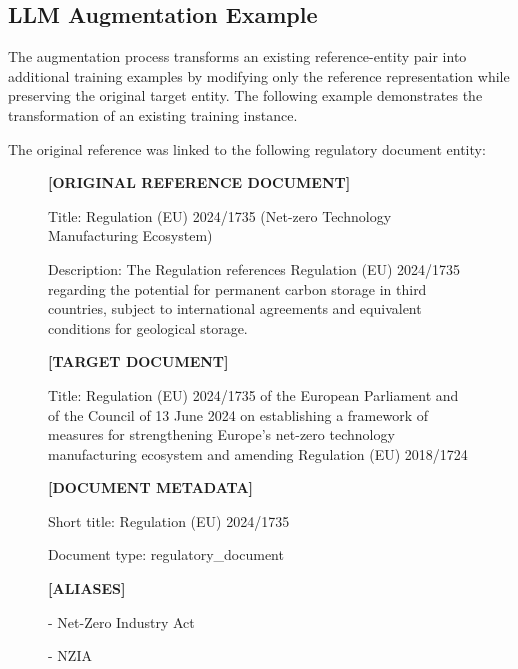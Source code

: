 \subsection{LLM Augmentation Example}

The augmentation process transforms an existing reference-entity pair into additional training examples by modifying only the reference representation while preserving the original target entity. The following example demonstrates the transformation of an existing training instance.

The original reference was linked to the following regulatory document entity:

\begin{figure}[H]
\centering

\begin{tcolorbox}[
    colback=gray!10,
    colframe=gray!50,
    boxrule=0.5pt,
    arc=2mm
]
\ttfamily
\small

\textbf{[ORIGINAL REFERENCE DOCUMENT]}

Title: Regulation (EU) 2024/1735 (Net-zero Technology Manufacturing Ecosystem)

\vspace{0.2cm}

Description: The Regulation references Regulation (EU) 2024/1735 regarding the potential for permanent carbon storage in third countries, subject to international agreements and equivalent conditions for geological storage.

\vspace{0.2cm}

\textbf{[TARGET DOCUMENT]}

Title: Regulation (EU) 2024/1735 of the European Parliament and of the Council of 13 June 2024 on establishing a framework of measures for strengthening Europe’s net-zero technology manufacturing ecosystem and amending Regulation (EU) 2018/1724

\vspace{0.2cm}

\textbf{[DOCUMENT METADATA]}

Short title: Regulation (EU) 2024/1735

Document type: regulatory\_document

\vspace{0.2cm}

\textbf{[ALIASES]}

- Net-Zero Industry Act

- NZIA

\vspace{0.4cm}


\end{tcolorbox}
\end{figure}
